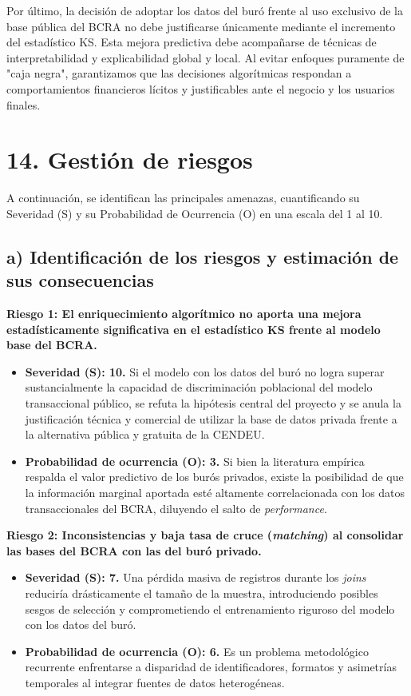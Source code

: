 \documentclass[
11pt, %
]{charter}
\begin{document}
Por último, la decisión de adoptar los datos del buró frente al uso exclusivo de la base pública del BCRA no debe justificarse únicamente mediante el incremento del estadístico KS. Esta mejora predictiva debe acompañarse de técnicas de interpretabilidad y explicabilidad global y local. Al evitar enfoques puramente de "caja negra", garantizamos que las decisiones algorítmicas respondan a comportamientos financieros lícitos y justificables ante el negocio y los usuarios finales.



\section{14. Gestión de riesgos}
\label{sec:riesgos}

A continuación, se identifican las principales amenazas, cuantificando su Severidad (S) y su Probabilidad de Ocurrencia (O) en una escala del 1 al 10.

\subsection*{a) Identificación de los riesgos y estimación de sus consecuencias}

\textbf{Riesgo 1: El enriquecimiento algorítmico no aporta una mejora estadísticamente significativa en el estadístico KS frente al modelo base del BCRA.}
\begin{itemize}
    \item \textbf{Severidad (S): 10.} Si el modelo con los datos del buró no logra superar sustancialmente la capacidad de discriminación poblacional del modelo transaccional público, se refuta la hipótesis central del proyecto y se anula la justificación técnica y comercial de utilizar la base de datos privada frente a la alternativa pública y gratuita de la CENDEU.
    \item \textbf{Probabilidad de ocurrencia (O): 3.} Si bien la literatura empírica respalda el valor predictivo de los burós privados, existe la posibilidad de que la información marginal aportada esté altamente correlacionada con los datos transaccionales del BCRA, diluyendo el salto de \textit{performance}.
\end{itemize}

\textbf{Riesgo 2: Inconsistencias y baja tasa de cruce (\textit{matching}) al consolidar las bases del BCRA con las del buró privado.}
\begin{itemize}
    \item \textbf{Severidad (S): 7.} Una pérdida masiva de registros durante los \textit{joins} reduciría drásticamente el tamaño de la muestra, introduciendo posibles sesgos de selección y comprometiendo el entrenamiento riguroso del modelo con los datos del buró.
    \item \textbf{Probabilidad de ocurrencia (O): 6.} Es un problema metodológico recurrente enfrentarse a disparidad de identificadores, formatos y asimetrías temporales al integrar fuentes de datos heterogéneas.
\end{itemize}
\end{document}
